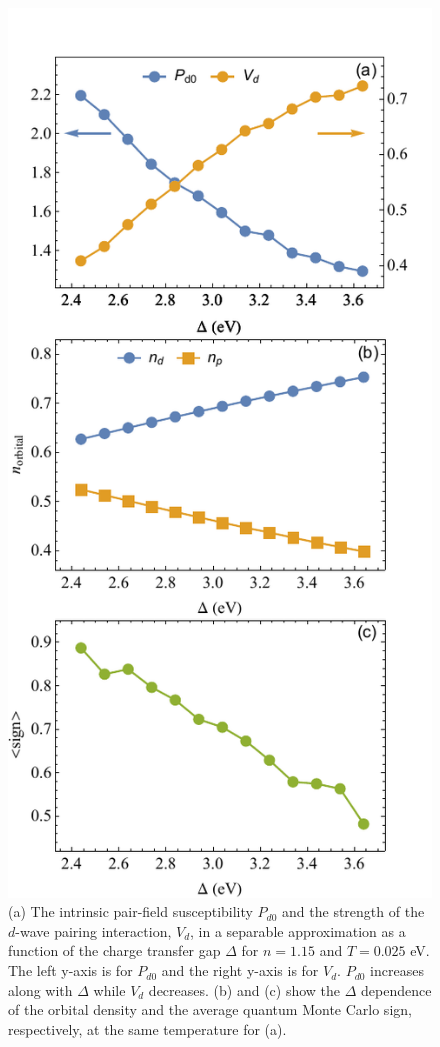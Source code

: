 \documentclass[reprint,nofootinbib,nobibnotes,amsmath,amssymb,aps,prb,floatfix]{revtex4-2}
\begin{document}
\begin{figure}[ht]
\includegraphics[width=0.88\columnwidth]{2by2vsCTE.pdf}
\caption{(a) The intrinsic pair-field susceptibility $P_{d0}$ and the strength of the $d$-wave pairing interaction, $V_d$, in a separable approximation as a function of the charge transfer gap $\Delta$ for $n=1.15$ and $T=0.025$ eV. The left y-axis is for $P_{d0}$ and the right y-axis is for $V_d$. $P_{d0}$ increases along with $\Delta$ while $V_d$ decreases. (b) and (c) show the $\Delta$ dependence of the orbital density and the average quantum Monte Carlo sign, respectively, at the same temperature for (a).}
\label{Pd0Vd0}
\end{figure}
\end{document}
